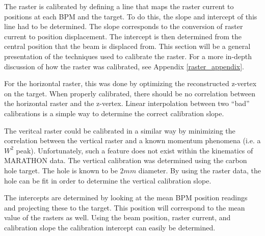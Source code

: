 The raster is calibrated by defining a line that maps the raster current to positions at each BPM and the target. To do this, the slope and intercept of this line had to be determined. The slope corresponds to the conversion of raster current to position displacement. The intercept is then determined from the central position that the beam is displaced from. This section will be a general presentation of the techniques used to calibrate the raster. For a more in-depth discussion of how the raster was calibrated, see Appendix \ref{raster_appendix}.

For the horizontal raster, this was done by optimizing the reconstructed z-vertex on the target. When properly calibrated, there should be no correlation between the horizontal raster and the z-vertex. Linear interpolation between two ``bad'' calibrations is a simple way to determine the correct calibration slope.

The veritcal raster could be calibrated in a similar way by minimizing the correlation between the vertical raster and a known momentum phenomena (i.e. a $W^2$ peak). Unfortunately, such a feature does not exist within the kinematics of MARATHON data. The vertical calibration was determined using the carbon hole target. The hole is known to be $2mm$ diameter. By using the raster data, the hole can be fit in order to determine the vertical calibration slope.

The intercepts are determined by looking at the mean BPM position readings and projecting these to the target. This position will correspond to the mean value of the rasters as well. Using the beam position, raster current, and calibration slope the calibration intercept can easily be determined.
